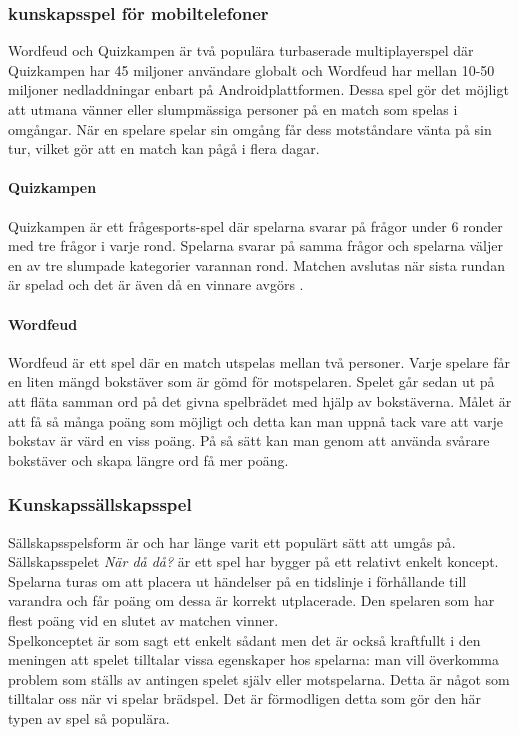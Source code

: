 \documentclass[12pt,a4paper]{article}
\begin{document}
\subsubsection{kunskapsspel för mobiltelefoner}
Wordfeud och Quizkampen är två populära turbaserade multiplayerspel där Quizkampen har 45 miljoner användare globalt\cite{quiz} och Wordfeud har mellan 10-50 miljoner nedladdningar enbart på Androidplattformen\cite{wordfeud}. Dessa spel gör det möjligt att utmana vänner eller slumpmässiga personer på en match som spelas i omgångar. När en spelare spelar sin omgång får dess motståndare vänta på sin tur, vilket gör att en match kan pågå i flera dagar.

\paragraph{Quizkampen \newline} 
Quizkampen \cite{aboutquiz} är ett frågesports-spel där spelarna svarar på frågor under 6 ronder med tre frågor i varje rond. Spelarna svarar på samma frågor och spelarna väljer en av tre slumpade kategorier varannan rond. Matchen avslutas när sista rundan är spelad och det är även då  en vinnare avgörs . 

\paragraph{Wordfeud \newline}
Wordfeud \cite{aboutwordfeud} är ett spel där en match utspelas mellan två personer. Varje spelare får en liten mängd bokstäver som är gömd för motspelaren. Spelet går sedan ut på att fläta samman ord på det givna spelbrädet med hjälp av bokstäverna. Målet är att få så många poäng som möjligt och detta kan man uppnå tack vare att varje bokstav är värd en viss poäng. På så sätt kan man genom att använda svårare bokstäver och skapa längre ord få mer poäng. 

\subsubsection{Kunskapssällskapsspel}

Sällskapsspelsform är och har länge varit ett populärt sätt att umgås på\cite{bradspel}. Sällskapsspelet \textit{När då då?}\cite{nardada} är ett spel har bygger på ett relativt enkelt koncept. Spelarna turas om att placera ut händelser på en tidslinje i förhållande till varandra och får poäng om dessa är korrekt utplacerade. Den spelaren som har flest poäng vid en slutet av matchen vinner. \\
Spelkonceptet är som sagt ett enkelt sådant men det är också kraftfullt i den meningen att spelet tilltalar vissa egenskaper hos spelarna: man vill överkomma problem som ställs av antingen spelet själv eller motspelarna. Detta är något som tilltalar oss när vi spelar brädspel\cite{psykologi}. Det är förmodligen detta som gör den här typen av spel så populära.
\end{document}

